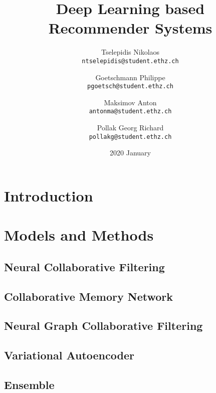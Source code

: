 \documentclass[
  twoColumns,
  fontsize=10pt,
  baseClass=extarticle
]{formularyETH/formularyETH}
\title{Deep Learning based Recommender Systems}
\author{
Tselepidis Nikolaos \\
\small{\texttt{ntselepidis@student.ethz.ch}}
    \and
Goetschmann Philippe \\
\small{\texttt{pgoetsch@student.ethz.ch}}
    \and
Maksimov Anton \\
\small{\texttt{antonma@student.ethz.ch}}
    \and
Pollak Georg Richard \\
\small{\texttt{pollakg@student.ethz.ch}}
}
\date{2020 January}
\begin{document}
\twocolumn[{%
  \begin{@twocolumnfalse} 
  \centering
  \maketitle
  \begin{abstract}
    
  \end{abstract}
  \end{@twocolumnfalse}
  \vspace*{-3em}
}]

\section{Introduction}\label{sec:introduction}


\section{Models and Methods}\label{sec:models_and_methods}
\subsection{Neural Collaborative Filtering}\label{subsec:neural_collaborative_filtering}

\subsection{Collaborative Memory Network}\label{subsec:collaborative_memory_network}

\subsection{Neural Graph Collaborative Filtering}\label{subsec:neural_graph_collaborative_filtering}

\subsection{Variational Autoencoder}\label{subsec:variational_autoencoder}

\subsection{Ensemble}\label{subsec:ensemble}

\end{document}
